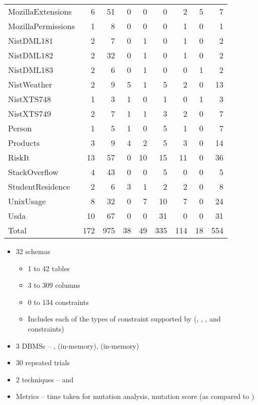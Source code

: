 \begin{table}[t!]
{\begin{tabular}{l@{\hskip -5pt}rrrrrrrr}
					MozillaExtensions & 6 & 51 & 0 & 0 & 0 & 2 & 5 & 7 \\
					MozillaPermissions & 1 & 8 & 0 & 0 & 0 & 1 & 0 & 1 \\
					NistDML181 & 2 & 7 & 0 & 1 & 0 & 1 & 0 & 2 \\
					NistDML182 & 2 & 32 & 0 & 1 & 0 & 1 & 0 & 2 \\
					NistDML183 & 2 & 6 & 0 & 1 & 0 & 0 & 1 & 2 \\
					NistWeather & 2 & 9 & 5 & 1 & 5 & 2 & 0 & 13 \\
					NistXTS748 & 1 & 3 & 1 & 0 & 1 & 0 & 1 & 3 \\
					NistXTS749 & 2 & 7 & 1 & 1 & 3 & 2 & 0 & 7 \\
					Person & 1 & 5 & 1 & 0 & 5 & 1 & 0 & 7 \\
					Products & 3 & 9 & 4 & 2 & 5 & 3 & 0 & 14 \\
					RiskIt & 13 & 57 & 0 & 10 & 15 & 11 & 0 & 36 \\
					StackOverflow & 4 & 43 & 0 & 0 & 5 & 0 & 0 & 5 \\
					StudentResidence & 2 & 6 & 3 & 1 & 2 & 2 & 0 & 8 \\
					UnixUsage & 8 & 32 & 0 & 7 & 10 & 7 & 0 & 24 \\
					Usda & 10 & 67 & 0 & 0 & 31 & 0 & 0 & 31 \\
					\hline
					{Total} & 172 & 975 & 38 & 49 & 335 & 114 & 18 & 554 \\
					\hline

				\end{tabular}
			}
		\end{table}

		\begin{itemize}
			\item 32 schemas
			\begin{itemize}
				\item 1 to 42 tables
				\item 3 to 309 columns
				\item 0 to 134 constraints
				\item Includes each of the types of constraint supported by \SchemaAnalyst (\PK, \FK, \NOTNULL, \UNIQUE and \CHECK constraints)
			\end{itemize}
			\item 3 DBMSs -- \Postgres, \HyperSQL (in-memory), \SQLite (in-memory)
			\item 30 repeated trials
			\item 2 techniques -- \Original and \VirtualMutationAnalysis
			\item Metrics -- time taken for mutation analysis, mutation score (as compared to \Original)
		\end{itemize}

